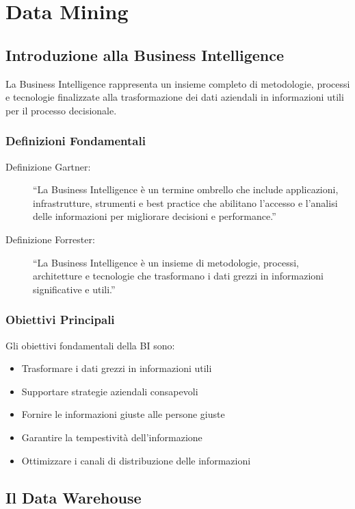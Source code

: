 \chapter{Data Mining}

\section{Introduzione alla Business Intelligence}

La Business Intelligence rappresenta un insieme completo di metodologie, processi e tecnologie finalizzate alla trasformazione dei dati aziendali in informazioni utili per il processo decisionale. 

\subsection{Definizioni Fondamentali}
\begin{description}
\item[Definizione Gartner:] ``La Business Intelligence è un termine ombrello che include applicazioni, infrastrutture, strumenti e best practice che abilitano l'accesso e l'analisi delle informazioni per migliorare decisioni e performance.''
\item[Definizione Forrester:] ``La Business Intelligence è un insieme di metodologie, processi, architetture e tecnologie che trasformano i dati grezzi in informazioni significative e utili.''
\end{description}

\subsection{Obiettivi Principali}
Gli obiettivi fondamentali della BI sono:
\begin{itemize}
\item Trasformare i dati grezzi in informazioni utili
\item Supportare strategie aziendali consapevoli
\item Fornire le informazioni giuste alle persone giuste
\item Garantire la tempestività dell'informazione
\item Ottimizzare i canali di distribuzione delle informazioni
\end{itemize}

\section{Il Data Warehouse}

